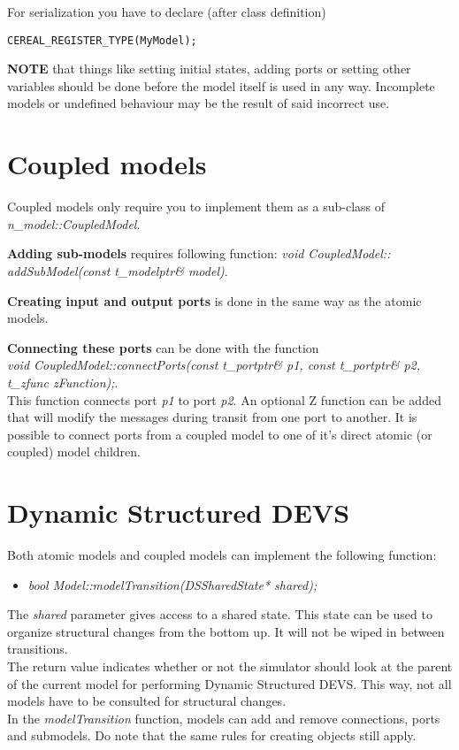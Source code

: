 For serialization you have to declare (after class definition)
\begin{verbatim}
CEREAL_REGISTER_TYPE(MyModel);
\end{verbatim}

\textbf{NOTE} that things like setting initial states, adding ports or setting other variables should be done before the model itself is used in any way. Incomplete models or undefined behaviour may be the result of said incorrect use.

\section{Coupled models}
Coupled models only require you to implement them as a sub-class of \\ \textsl{n\_model::CoupledModel}.

\textbf{Adding sub-models} requires following function: \textsl{void CoupledModel:: \\addSubModel(const t\_modelptr\& model)}.

\textbf{Creating input and output ports} is done in the same way as the atomic models.

\textbf{Connecting these ports} can be done with the function\\ \textsl{void CoupledModel::connectPorts(const t\_portptr\& p1, const t\_portptr\& p2, t\_zfunc zFunction);}.\\ This function connects port \textsl{p1} to port \textsl{p2}. An optional Z function can be added that will modify the messages during transit from one port to another.
It is possible to connect ports from a coupled model to one of it's direct atomic (or coupled) model children.

\section{Dynamic Structured DEVS}
Both atomic models and coupled models can implement the following function:
\begin{itemize}
	\item \textsl{bool Model::modelTransition(DSSharedState* shared);}
\end{itemize}
The \textsl{shared} parameter gives access to a shared state. This state can be used to organize structural changes from the bottom up. It will not be wiped in between transitions.\\
The return value indicates whether or not the simulator should look at the parent of the current model for performing Dynamic Structured DEVS. This way, not all models have to be consulted for structural changes.\\
In the \textsl{modelTransition} function, models can add and remove connections, ports and submodels. Do note that the same rules for creating objects still apply.